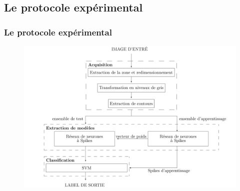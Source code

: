 \documentclass{beamer}
\begin{document}
\subsection{Le protocole expérimental}
\begin{frame}
  \frametitle{Le protocole expérimental}
  \begin{figure}
    \centering
    \includegraphics[scale=0.13]{image/archi.png}
  \end{figure}
\end{frame}

\end{document}
